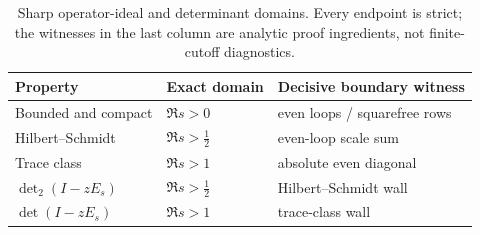 \begin{table}[t]
\centering
\small
\begin{tabular}{lll}
\toprule
Property & Exact domain & Decisive boundary witness \\
\midrule
Bounded and compact & $\Re s>0$ & even loops / squarefree rows \\
Hilbert--Schmidt & $\Re s>\tfrac12$ & even-loop scale sum \\
Trace class & $\Re s>1$ & absolute even diagonal \\
$\det_2(I-zE_s)$ & $\Re s>\tfrac12$ & Hilbert--Schmidt wall \\
$\det(I-zE_s)$ & $\Re s>1$ & trace-class wall \\
\bottomrule
\end{tabular}
\caption{Sharp operator-ideal and determinant domains.  Every endpoint is
strict; the witnesses in the last column are analytic proof ingredients,
not finite-cutoff diagnostics.}
\label{tab:phase}
\end{table}
